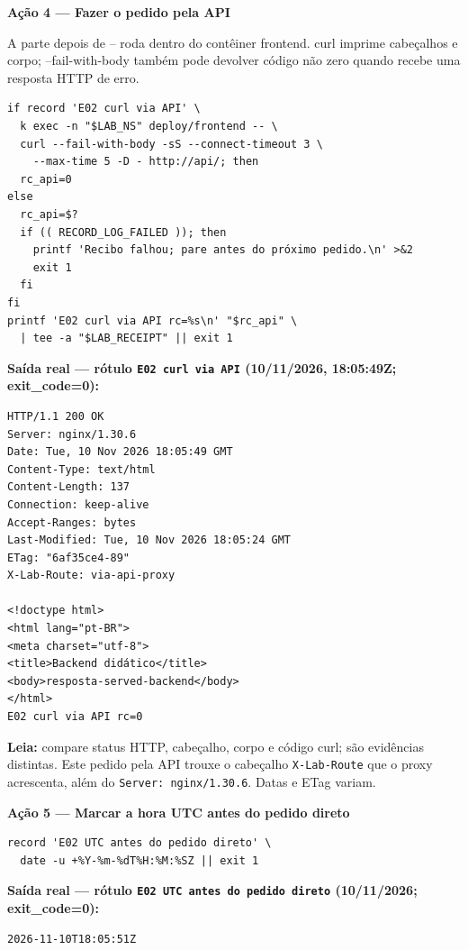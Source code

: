\documentclass[12pt,openany,oneside,a4paper,chapter=TITLE,english,brazil]{abntex2}
\begin{document}
\textbf{Ação 4 --- Fazer o pedido pela API}

A parte depois de -- roda dentro do contêiner frontend. curl imprime cabeçalhos e corpo; --fail-with-body também pode devolver código não zero quando recebe uma resposta HTTP de erro.

\begin{verbatim}
if record 'E02 curl via API' \
  k exec -n "$LAB_NS" deploy/frontend -- \
  curl --fail-with-body -sS --connect-timeout 3 \
    --max-time 5 -D - http://api/; then
  rc_api=0
else
  rc_api=$?
  if (( RECORD_LOG_FAILED )); then
    printf 'Recibo falhou; pare antes do próximo pedido.\n' >&2
    exit 1
  fi
fi
printf 'E02 curl via API rc=%s\n' "$rc_api" \
  | tee -a "$LAB_RECEIPT" || exit 1
\end{verbatim}

\clearpage

\textbf{Saída real --- rótulo \texttt{E02 curl via API} (10/11/2026, 18:05:49Z; exit\_code=0):}

\begin{verbatim}
HTTP/1.1 200 OK
Server: nginx/1.30.6
Date: Tue, 10 Nov 2026 18:05:49 GMT
Content-Type: text/html
Content-Length: 137
Connection: keep-alive
Accept-Ranges: bytes
Last-Modified: Tue, 10 Nov 2026 18:05:24 GMT
ETag: "6af35ce4-89"
X-Lab-Route: via-api-proxy

<!doctype html>
<html lang="pt-BR">
<meta charset="utf-8">
<title>Backend didático</title>
<body>resposta-served-backend</body>
</html>
E02 curl via API rc=0
\end{verbatim}

\textbf{Leia:} compare status HTTP, cabeçalho, corpo e código curl; são evidências distintas. Este pedido pela API trouxe o cabeçalho \texttt{X-{}\allowbreak{}Lab-{}\allowbreak{}Route} que o proxy acrescenta, além do \texttt{Server:\allowbreak{} nginx/\allowbreak{}1.\allowbreak{}30.\allowbreak{}6}. Datas e ETag variam.

\textbf{Ação 5 --- Marcar a hora UTC antes do pedido direto}

\begin{verbatim}
record 'E02 UTC antes do pedido direto' \
  date -u +%Y-%m-%dT%H:%M:%SZ || exit 1
\end{verbatim}

\textbf{Saída real --- rótulo \texttt{E02 UTC antes do pedido direto} (10/11/2026; exit\_code=0):}

\begin{verbatim}
2026-11-10T18:05:51Z
\end{verbatim}
\end{document}

